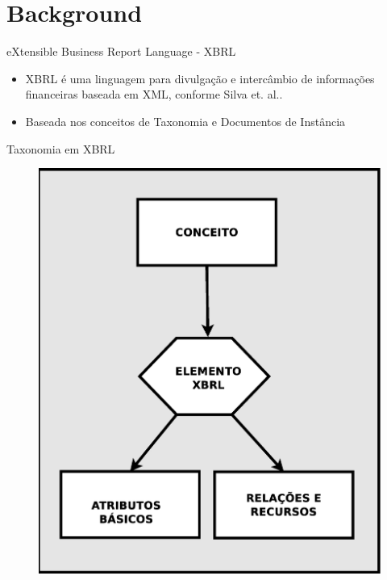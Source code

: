 \documentclass[t,14pt,mathserif]{beamer}
\begin{document}
\section{Background}
\begin{frame}{eXtensible Business Report Language - XBRL}

    \begin{itemize}
      \item \alert{XBRL} é uma linguagem para divulgação e intercâmbio de
        informações financeiras baseada em XML, conforme Silva et. al.\cite{xbrl_conceitos_aplicacoes}.
      \item Baseada nos conceitos de \alert{Taxonomia} e \alert{Documentos de Instância}
    \end{itemize}
\end{frame}
\begin{frame}{Taxonomia em XBRL}
    \begin{figure}[htb]
\centering
\includegraphics[width=.357\textwidth]{../img/taxonomia.eps}
\end{figure}
\end{frame}
\end{document}
